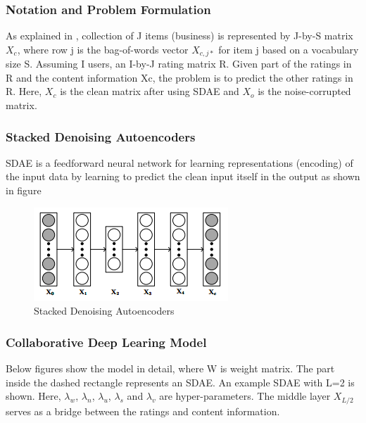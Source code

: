 \documentclass[11pt]{article}
\begin{document}
		\subsubsection{Notation and Problem Formulation}
		As explained in \cite{cdl}, collection of J items (business) is represented by J-by-S matrix $X_c$, where row j is the bag-of-words vector $X_{c,j*}$ for item j based on a vocabulary size S. Assuming I users, an I-by-J rating matrix R. Given part of the ratings in R and the content information Xc, the problem is to predict the other ratings in R. Here, $X_c$ is the clean matrix after using SDAE and $X_o$ is the noise-corrupted matrix.
		  
		\subsubsection{Stacked Denoising Autoencoders}
		SDAE \cite{sdae} is a feedforward neural network for learning representations (encoding) of the input data by learning to predict the clean input itself in the output as shown in figure
		\begin{figure}[H]
			\centering
			\includegraphics[scale=0.7]{sdae.png}
			\caption{Stacked Denoising Autoencoders}
		\end{figure}
		
		\subsubsection{Collaborative Deep Learing Model}
		Below figures show the model in detail, where W is weight matrix. The part inside the dashed rectangle represents an SDAE. An example SDAE with L=2 is shown. Here, $\lambda_w$, $\lambda_n$, $\lambda_u$, $\lambda_s$ and $\lambda_v$ are hyper-parameters. The middle layer $X_{L/2}$ serves as a bridge between the ratings and content information. 
		
\end{document}
